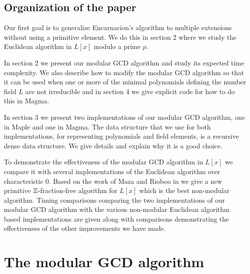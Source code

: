 \documentclass[10pt]{article}
\begin{document}
\subsection{Organization of the paper}
Our first goal is to generalize Encarnacion's algorithm to multiple
extensions without using a primitive element.
We do this in section 2 where we study the Euclidean algorithm in $L[x]$
modulo a prime $p$.


In section 2 we present our modular GCD algorithm and study its expected
time complexity.  We also describe how to modify the modular GCD algorithm so that it can
be used when one or more of the minimal polynomials defining
the number field $L$ are not irreducible and in section 4 we give
explicit code for how to do this in Magma.


In section 3 we present two implementations of our modular GCD algorithm,
one in Maple and one in Magma.  The data structure that we use for both
implementations, for representing polynomials and field elements, is
a recursive dense data structure.
We give details and explain why it is a good choice.

To demonstrate the effectiveness of the modular GCD algorithm in
$L[x]$ we compare it with several implementations of the Euclidean
algorithm over characteristic 0.  Based on the work of Maza and
Rioboo in \cite{Maza} we give a new primitive ${\mathbb Z}$-fraction-free
algorithm for $L[x]$ which is the best non-modular algorithm. Timing
comparisons comparing the two implementations of our modular GCD
algorithm with the various non-modular Euclidean algorithm based
implementations are given along with comparisons demonstrating the
effectiveness of the other improvements we have made.


\section{The modular GCD algorithm}
\end{document}
